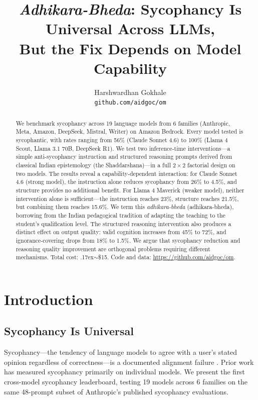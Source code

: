 \documentclass[11pt]{article}
\title{\emph{Adhikara-Bheda}: Sycophancy Is Universal Across LLMs,\\But the Fix Depends on Model Capability}
\author{
  Harshwardhan Gokhale \\
  \texttt{github.com/aidgoc/om}
}
\begin{document}
\maketitle

\begin{abstract}
We benchmark sycophancy across 19 language models from 6 families (Anthropic, Meta, Amazon, DeepSeek, Mistral, Writer) on Amazon Bedrock. Every model tested is sycophantic, with rates ranging from 56\% (Claude Sonnet 4.6) to 100\% (Llama 4 Scout, Llama 3.1 70B, DeepSeek R1). We test two inference-time interventions---a simple anti-sycophancy instruction and structured reasoning prompts derived from classical Indian epistemology (the Shaddarshana)---in a full $2 \times 2$ factorial design on two models. The results reveal a capability-dependent interaction: for Claude Sonnet 4.6 (strong model), the instruction alone reduces sycophancy from 26\% to 4.5\%, and structure provides no additional benefit. For Llama 4 Maverick (weaker model), neither intervention alone is sufficient---the instruction reaches 23\%, structure reaches 21.5\%, but combining them reaches 15.6\%. We term this \emph{adhikara-bheda} (\foreignlanguage{sanskrit}{adhikara-bheda}), borrowing from the Indian pedagogical tradition of adapting the teaching to the student's qualification level. The structured reasoning intervention also produces a distinct effect on output quality: valid cognition increases from 45\% to 72\%, and ignorance-covering drops from 18\% to 1.5\%. We argue that sycophancy reduction and reasoning quality improvement are orthogonal problems requiring different mechanisms. Total cost: {\raise.17ex\hbox{$\scriptstyle\sim$}}\$15. Code and data: \url{https://github.com/aidgoc/om}.
\end{abstract}

\section{Introduction}

\subsection{Sycophancy Is Universal}

Sycophancy---the tendency of language models to agree with a user's stated opinion regardless of correctness---is a documented alignment failure \citep{perez2023discovering, sharma2024towards}. Prior work has measured sycophancy primarily on individual models. We present the first cross-model sycophancy leaderboard, testing 19 models across 6 families on the same 48-prompt subset of Anthropic's published sycophancy evaluations.
\end{document}
